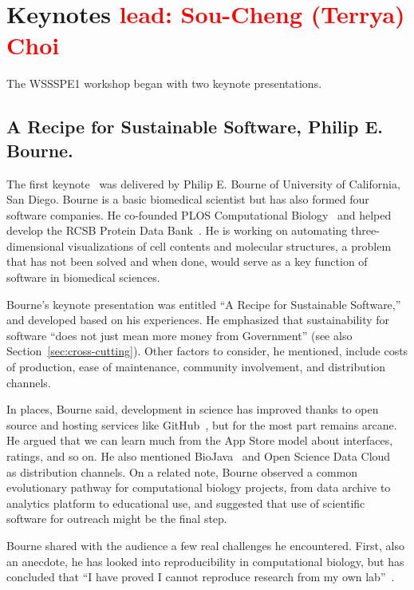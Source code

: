 \documentclass[11pt, oneside]{amsart}
\newcommand{\note}[1]{ {\textcolor{red}    { #1 }}}
\begin{document}
\section{Keynotes \note{lead: Sou-Cheng (Terrya) Choi} } \label{sec:keynotes}


The WSSSPE1 workshop began with two keynote presentations.


\subsection{A Recipe for Sustainable Software, Philip E. Bourne.} \label{sec:keynote1}

The first keynote~\cite{WSSSPE1-keynote1} was delivered by Philip
E. Bourne of University of California, San Diego.  Bourne is a basic
biomedical scientist but has also formed four software companies. He co-founded 
PLOS Computational Biology~\cite{plos-web} and helped develop the RCSB
Protein Data Bank~\cite{pdb-web}.  
He is working on automating three-dimensional visualizations of cell
contents and molecular structures, a problem that has not been solved
and when done, would serve as a key function of software in biomedical
sciences.

Bourne's keynote presentation was entitled ``A Recipe for Sustainable
Software,'' and developed based on his experiences.  He emphasized that
sustainability for software ``does not just mean more money from
Government'' (see also Section~\ref{sec:cross-cutting}).  Other
factors to consider, he mentioned, include costs of production, ease
of maintenance, community involvement, and distribution channels.

In places, Bourne said, development in science has improved thanks to
open source and hosting services like GitHub~\cite{github-web}, but for the most part
remains arcane. He argued that we can learn much from the App Store
model about interfaces, ratings, and so on. He also mentioned
BioJava~\cite{biojava-web} and Open Science Data Cloud~\cite{osdc-web}
as distribution channels.  On a related note, Bourne observed a common
evolutionary pathway for computational biology projects, from data
archive to analytics platform to educational use, and suggested that
use of scientific software for outreach might be the final step.

Bourne shared with the audience a few real challenges he
encountered. First, also an anecdote, he has looked into
reproducibility in computational biology, but has concluded that ``I
have proved I cannot reproduce research from my own
lab''~\cite{Veretnik}.
\end{document}
